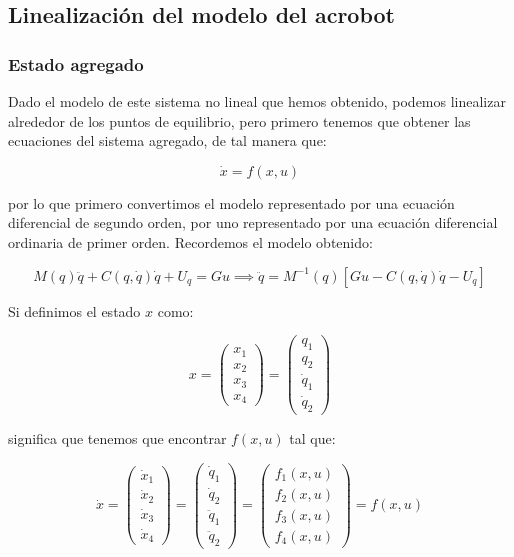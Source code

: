 \documentclass{article}
\begin{document}
    \subsection*{Linealización del modelo del
acrobot}\label{linealizaciuxf3n-del-modelo-del-acrobot}

    \subsubsection*{Estado agregado}\label{estado-agregado}

    Dado el modelo de este sistema no lineal que hemos obtenido, podemos
linealizar alrededor de los puntos de equilibrio, pero primero tenemos
que obtener las ecuaciones del sistema agregado, de tal manera que:

\[
\dot{x} = f(x, u)
\]

por lo que primero convertimos el modelo representado por una ecuación
diferencial de segundo orden, por uno representado por una ecuación
diferencial ordinaria de primer orden. Recordemos el modelo obtenido:

\[
M(q) \ddot{q} + C(q, \dot{q}) \dot{q} + U_q = G u \implies \ddot{q} = M^{-1}(q) \left[ G u - C(q, \dot{q}) \dot{q} - U_q \right]
\]

Si definimos el estado \(x\) como:

\[
x =
\begin{pmatrix}
x_1 \\
x_2 \\
x_3 \\
x_4
\end{pmatrix} =
\begin{pmatrix}
q_1 \\
q_2 \\
\dot{q}_1 \\
\dot{q}_2
\end{pmatrix}
\]

significa que tenemos que encontrar \(f(x, u)\) tal que:

\[
\dot{x} =
\begin{pmatrix}
\dot{x}_1 \\
\dot{x}_2 \\
\dot{x}_3 \\
\dot{x}_4
\end{pmatrix} =
\begin{pmatrix}
\dot{q}_1 \\
\dot{q}_2 \\
\ddot{q}_1 \\
\ddot{q}_2
\end{pmatrix} =
\begin{pmatrix}
f_1(x, u) \\
f_2(x, u) \\
f_3(x, u) \\
f_4(x, u)
\end{pmatrix} = f(x, u)
\]
\end{document}
